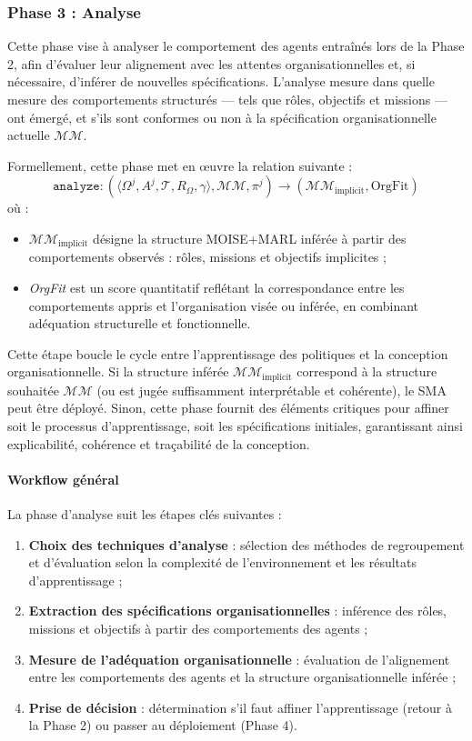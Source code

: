 \subsubsection{Phase 3 : Analyse}

Cette phase vise à analyser le comportement des agents entraînés lors de la Phase 2, afin d'évaluer leur alignement avec les attentes organisationnelles et, si nécessaire, d'inférer de nouvelles spécifications. L'analyse mesure dans quelle mesure des comportements structurés — tels que rôles, objectifs et missions — ont émergé, et s'ils sont conformes ou non à la spécification organisationnelle actuelle $\mathcal{MM}$.

Formellement, cette phase met en œuvre la relation suivante :
\[
    \texttt{analyze}: \left( \langle \Omega^j, A^j, \mathcal{T}, R_{\Omega}, \gamma \rangle, \mathcal{MM}, \pi^j \right) \longrightarrow (\mathcal{MM}_{\text{implicit}}, \text{OrgFit})
\]
où :
\begin{itemize}
    \item $\mathcal{MM}_{\text{implicit}}$ désigne la structure MOISE+MARL inférée à partir des comportements observés : rôles, missions et objectifs implicites ;
    \item \textit{OrgFit} est un score quantitatif reflétant la correspondance entre les comportements appris et l'organisation visée ou inférée, en combinant adéquation structurelle et fonctionnelle.
\end{itemize}

Cette étape boucle le cycle entre l'apprentissage des politiques et la conception organisationnelle. Si la structure inférée $\mathcal{MM}_{\text{implicit}}$ correspond à la structure souhaitée $\mathcal{MM}$ (ou est jugée suffisamment interprétable et cohérente), le SMA peut être déployé. Sinon, cette phase fournit des éléments critiques pour affiner soit le processus d'apprentissage, soit les spécifications initiales, garantissant ainsi explicabilité, cohérence et traçabilité de la conception.

\paragraph{Workflow général}

La phase d'analyse suit les étapes clés suivantes :
\begin{enumerate}
    \item \textbf{Choix des techniques d'analyse} : sélection des méthodes de regroupement et d'évaluation selon la complexité de l'environnement et les résultats d'apprentissage ;
    \item \textbf{Extraction des spécifications organisationnelles} : inférence des rôles, missions et objectifs à partir des comportements des agents ;
    \item \textbf{Mesure de l'adéquation organisationnelle} : évaluation de l'alignement entre les comportements des agents et la structure organisationnelle inférée ;
    \item \textbf{Prise de décision} : détermination s'il faut affiner l'apprentissage (retour à la Phase 2) ou passer au déploiement (Phase 4).
\end{enumerate}

